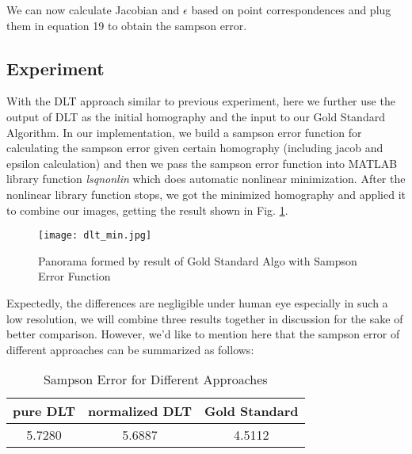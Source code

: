 \documentclass[conference]{IEEEtran}
\begin{document}
We can now calculate Jacobian and $\epsilon$ based on point correspondences and plug them in equation 19 to obtain the sampson error.

\subsection{Experiment}
With the DLT approach similar to previous experiment, here we further use the output of DLT as the initial homography and the input to our Gold Standard Algorithm. In our implementation, we build a sampson error function for calculating the sampson error given certain homography (including jacob and epsilon calculation) and then we pass the sampson error function into MATLAB library function \emph{lsqnonlin} which does automatic nonlinear minimization. After the nonlinear library function stops, we got the minimized homography and applied it to combine our images, getting the result shown in Fig. \ref{dlt_min}.
\begin{figure}[htbp]
\begin{center}
\texttt{[image: dlt\_min.jpg]} 
\end{center}	   
\caption{Panorama formed by result of Gold Standard Algo with Sampson Error Function}\label{dlt_min}
\end{figure}

Expectedly, the differences are negligible under human eye especially in such a low resolution, we will combine three results together in discussion for the sake of better comparison. However, we'd like to mention here that the sampson error of different approaches can be summarized as follows:
\begin{table}[!htp]
  \centering
  \caption{Sampson Error for Different Approaches}
  \label{sampson_error}
  \begin{tabular}{ccc}
    \toprule
    pure DLT& normalized DLT & Gold Standard\\
	\midrule
		5.7280 & 5.6887 & 4.5112\\
          \bottomrule
  \end{tabular}
\end{table}

\onecolumn
\end{document}
